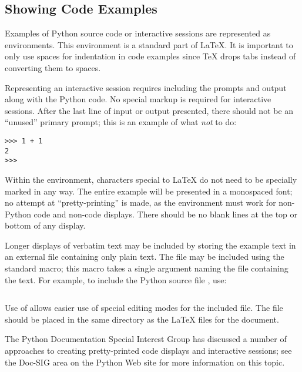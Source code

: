 \documentclass{howto}
\begin{document}
  \subsection{Showing Code Examples}

    Examples of Python source code or interactive sessions are
    represented as  environments.  This environment
    is a standard part of \LaTeX{}.  It is important to only use
    spaces for indentation in code examples since \TeX{} drops tabs
    instead of converting them to spaces.

    Representing an interactive session requires including the prompts
    and output along with the Python code.  No special markup is
    required for interactive sessions.  After the last line of input
    or output presented, there should not be an ``unused'' primary
    prompt; this is an example of what \emph{not} to do:

\begin{verbatim}
>>> 1 + 1
2
>>> 
\end{verbatim}

    Within the  environment, characters special to
    \LaTeX{} do not need to be specially marked in any way.  The entire
    example will be presented in a monospaced font; no attempt at
    ``pretty-printing'' is made, as the environment must work for
    non-Python code and non-code displays.  There should be no blank
    lines at the top or bottom of any  display.

    Longer displays of verbatim text may be included by storing the
    example text in an external file containing only plain text.  The
    file may be included using the standard 
    macro; this macro takes a single argument naming the file
    containing the text.  For example, to include the Python source
    file , use:

\begin{verbatim}

\end{verbatim}

    Use of  allows easier use of special editing
    modes for the included file.  The file should be placed in the
    same directory as the \LaTeX{} files for the document.

    The Python Documentation Special Interest Group has discussed a
    number of approaches to creating pretty-printed code displays and
    interactive sessions; see the Doc-SIG area on the Python Web site
    for more information on this topic.
\end{document}
